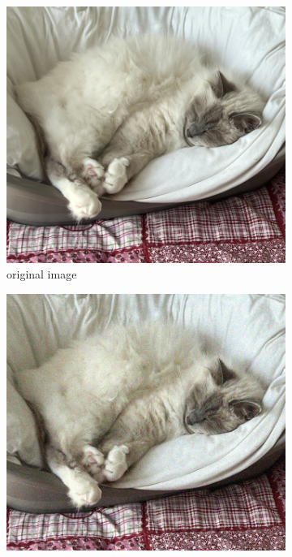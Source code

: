 \documentclass[a4paper, twocolumn, twoside]{article}
\begin{document}
\begin{figure}[h!]
    \centering
    \begin{subfigure}{.24\textwidth}
        \centering
        \includegraphics[width=\linewidth]{images/original_cat.png}
        \caption{original image}
    \end{subfigure}
    \hfill
    \begin{subfigure}{.24\textwidth}
        \centering
        \includegraphics[width=\linewidth]{images/noisy_cat.png}

\end{subfigure}
\end{figure}
\end{document}
